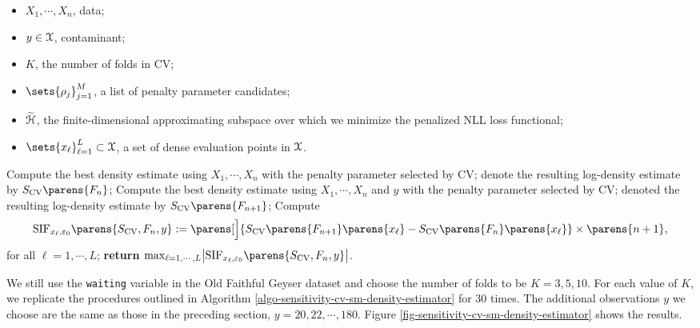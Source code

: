 \begin{algorithm}
\caption{Computation of the overall influence of $K$-fold cross-validated penalized SM density estimator}\label{algo-sensitivity-cv-sm-density-estimator}
\begin{algorithmic}[1]
\Statex \algorithmicrequire 
\begin{itemize}\setlength\itemsep{0em}
	\item $X_1, \cdots, X_n$, data; 
	\item $y \in \mathcal{X}$, contaminant; 
	\item $K$, the number of folds in CV; 
	\item $\sets{\rho_j}_{j=1}^{M}$, a list of penalty parameter candidates; 
	\item $\widetilde{\mathcal{H}}$, the finite-dimensional approximating subspace over which we minimize the penalized NLL loss functional; 
	\item $\sets{x_{\ell}}_{\ell=1}^L \subset \calX$, a set of dense evaluation points in $\mathcal{X}$. 
\end{itemize}

\vspace{5pt}

\State Compute the best density estimate using $X_1, \cdots, X_n$ with the penalty parameter selected by CV; denote the resulting log-density estimate by $S_{\mathrm{CV}} \parens{F_n}$; 
\State Compute the best density estimate using $X_1, \cdots, X_n$ and $y$ with the penalty parameter selected by CV; denoted the resulting log-density estimate by $S_{\mathrm{CV}} \parens{F_{n+1}}$; 
\State Compute 
\begin{align*}
	\mathrm{SIF}_{x_{\ell}, \varepsilon_0} \parens{S_{\mathrm{CV}}, F_n, y} := \parens[\Big]{S_{\mathrm{CV}} \parens{F_{n+1}} \parens{x_\ell} - S_{\mathrm{CV}} \parens{F_{n}} \parens{x_\ell}} \times \parens{n+1}, 
\end{align*}
for all $\ell = 1, \cdots, L$; 
\State \textbf{return} $\max_{\ell=1,\cdots,L} \abs[\big]{\mathrm{SIF}_{x_{\ell}, \varepsilon_0} \parens{S_{\mathrm{CV}}, F_n, y}}$. 
\end{algorithmic}
\end{algorithm}

We still use the \texttt{waiting} variable in the Old Faithful Geyser dataset and choose the number of folds to be $K = 3, 5, 10$. For each value of $K$, we replicate the procedures outlined in Algorithm \ref{algo-sensitivity-cv-sm-density-estimator} for 30 times. The additional observations $y$ we choose are the same as those in the preceding section, $y = 20, 22, \cdots, 180$. Figure \ref{fig-sensitivity-cv-sm-density-estimator} shows the results. 

